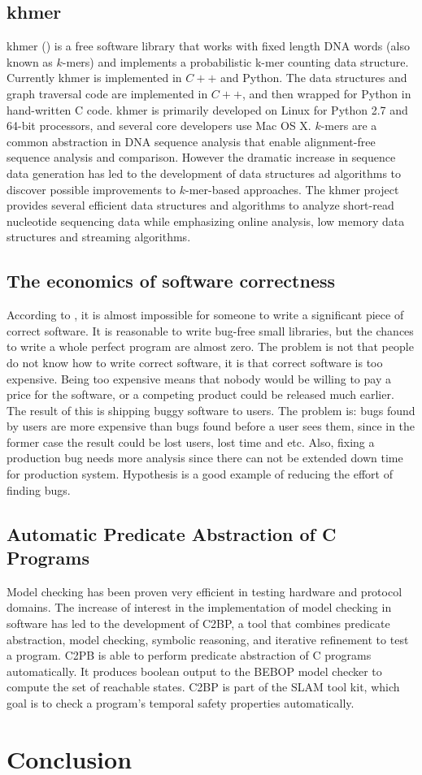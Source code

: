\documentclass[preprint,nocopyrightspace]{sig-alternate}
\begin{document}
\subsection{khmer}
khmer (\citet{crusoe_khmer_2015}) is a free software library that works with fixed length DNA words (also known as $k$-mers) and implements a probabilistic k-mer counting data structure.
Currently khmer is implemented in $C++$ and Python.
The data structures and graph traversal code are implemented in $C++$,
and then wrapped for Python in hand-written C code.
khmer is primarily developed on Linux for Python 2.7 and 64-bit processors,
and several core developers use Mac OS X.
$k$-mers are a common abstraction in DNA sequence analysis that enable alignment-free sequence analysis and comparison.
However the dramatic increase in sequence data generation has led to the development of data structures ad algorithms to discover possible improvements to $k$-mer-based approaches.
The khmer project provides several efficient data structures and algorithms to analyze short-read nucleotide sequencing data while emphasizing online analysis,
low memory data structures and streaming algorithms.

\subsection{The economics of software correctness}
According to \citet{maciver_economics_2015},
it is almost impossible for someone to write a significant piece of correct software.
It is reasonable to write bug-free small libraries,
but the chances to write a whole perfect program are almost zero.
The problem is not that people do not know how to write correct software,
it is that correct software is too expensive.
Being too expensive means that nobody would be willing to pay a price for the software,
or a competing product could be released much earlier.
The result of this is shipping buggy software to users.
The problem is:
bugs found by users are more expensive than bugs found before a user sees them,
since in the former case the result could be lost users, lost time and etc.
Also, fixing a production bug needs more analysis since 
there can not be extended down time for production system.
Hypothesis is a good example of reducing the effort of finding bugs.

\subsection{Automatic Predicate Abstraction of C Programs}
Model checking has been proven very efficient in testing hardware and protocol domains.\citet{model_checking}
The increase of interest in the implementation of model checking in software has led to the development of C2BP,
a tool that combines predicate abstraction, model checking, symbolic reasoning, and iterative refinement to test a program.
C2PB is able to perform predicate abstraction of C programs automatically.
It produces boolean output to the BEBOP model checker to compute the set of reachable states.
C2BP is part of the SLAM tool kit, which goal is to check a program’s temporal safety properties automatically.

\section{Conclusion}


\end{document}
